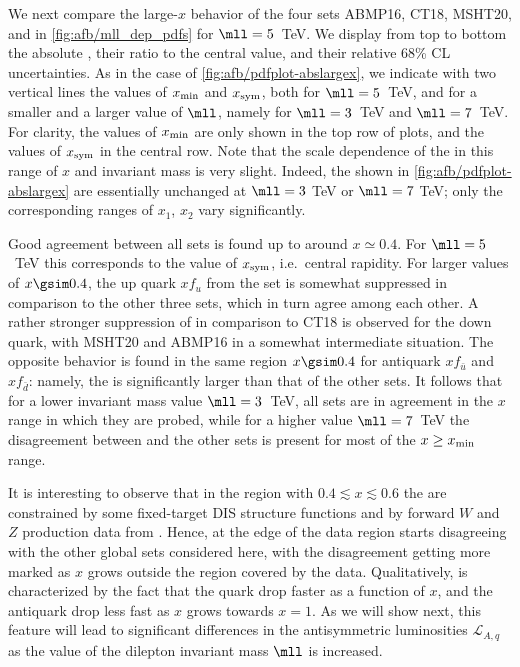 We next compare the large-$x$ behavior 
of the four \pdf sets ABMP16, CT18, MSHT20, and  in \cref{fig:afb/mll_dep_pdfs}
for $\mll=5$~TeV.
%
We display from top to bottom the absolute \pdfs, their ratio to the central  value, and
their relative 68\% CL uncertainties.
%
As in the case of \cref{fig:afb/pdfplot-abslargex}, we indicate with two vertical lines
the values of $x_{\rm min}$ and $x_{\rm  sym}$,
both for $\mll=5$~TeV, and for a smaller and a larger value of $\mll$,
namely for $\mll=3$~TeV and  $\mll=7$~TeV.
%
For clarity, the values of $x_{\rm min}$ are only shown 
in the top row of plots, and the values of  $x_{\rm  sym}$ in the
central row. Note that the scale dependence
of the \pdfs in this range of  $x$ and invariant mass is very
slight. Indeed, the \pdfs shown in \cref{fig:afb/pdfplot-abslargex} are
essentially unchanged at $\mll=3$ TeV or  $\mll=7$ TeV;  only the
corresponding ranges of $x_1$, $x_2$ vary significantly.

Good agreement between all \pdf
sets is found up to around $x\simeq 0.4$.
%
For $\mll=5$~TeV this corresponds to the value of $x_{\rm sym}$, i.e.\ central rapidity.
%
For larger values of $x\gsim 0.4$, the up  quark \pdf $xf_u$ from the
 set is somewhat
suppressed in comparison to the other three sets, which in turn agree
among each other.
%
A rather stronger suppression of
  in comparison to  CT18 is observed for the down quark, with
MSHT20 and ABMP16 in a somewhat intermediate situation.
%
The opposite behavior is found in the same region $x\gsim 0.4$ for
antiquark \pdfs  $xf_{\bar{u}}$ and $xf_{\bar{d}}$:
namely, the  \pdf is significantly  larger than that of the other sets.
It follows that for a lower invariant mass value  $\mll = 3$~TeV, all
\pdf sets are  in agreement in the $x$ range in which they are probed,
while for a higher value  $\mll = 7$~TeV the 
disagreement between  and the other \pdf sets is present for
most of the $x\ge x_{\rm min}$ range.

It is interesting to observe that in the region with $0.4\lesssim x\lesssim
0.6$ the \pdfs are constrained by some fixed-target DIS structure functions and
by forward $W$ and $Z$ production data from \lhcb.
Hence, at the edge of the data region  starts disagreeing with the
other global \pdf sets considered here, with the disagreement getting more
marked as $x$ grows outside the region covered by the data.
%
Qualitatively,  is characterized by the fact that the
quark \pdfs drop faster as a function of $x$, and the antiquark \pdfs
drop less fast as $x$ grows towards $x=1$.
As we will show next, this feature will lead to significant differences
in the antisymmetric \pdf luminosities $\mathcal{L}_{A,q}$ as the value of
the dilepton invariant mass $\mll$ is increased.

